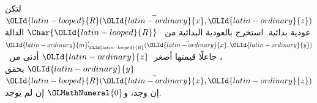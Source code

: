 \documentclass[../../../include/open-logic-section]{subfiles}
\begin{document}
\begin{prob}
لتكن $\OLId{latin-looped}{R}(\vec \OLId{latin-ordinary}{x},\OLId{latin-ordinary}{z})$ عودية بدائية. استخرج بالعودية البدائية من
~$\Char{\OLId{latin-looped}{R}}$ الدالة $\OLId{latin-ordinary}{m}'_\OLId{latin-looped}{R}(\vec{\OLId{latin-ordinary}{x}},\OLId{latin-ordinary}{y})$، جاعلًا قيمتها أصغر~$\OLId{latin-ordinary}{z}$ أدنى من~$\OLId{latin-ordinary}{y}$
يحقق $\OLId{latin-looped}{R}(\vec{\OLId{latin-ordinary}{x}},\OLId{latin-ordinary}{z})$ إن وجد، و$\OLMathNumeral{0}$ إن لم يوجد.
\end{prob}
\end{document}
